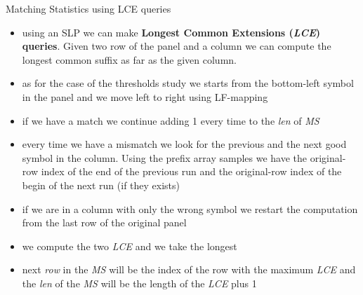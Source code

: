 \documentclass{beamer}
\begin{document}
\begin{frame}{Matching Statistics using LCE queries}
  \begin{block}{}
    \small
    \begin{itemize}
      \item using an SLP we can make \textbf{Longest Common Extensions
        (\textit{LCE}) queries}. Given two row of the panel and a column we can
      compute the longest common suffix as far as the given column.
      \item as for the case of the thresholds study we starts from the
      bottom-left symbol in the panel and we move left to right using LF-mapping
      
      \item if we have a match we continue adding 1 every time to the
      \textit{len} of \textit{MS}
      \item every time we have a mismatch we look for the previous and the next
      good symbol in the column. Using the prefix array samples we have the
      original-row index of the end of the previous run and the original-row
      index of the begin of the next run (if they exists)
      \item if we are in a column with only the wrong symbol we restart the
      computation from the last row of the original panel
      \item we compute the two \textit{LCE} and we take the longest
      \item next \textit{row} in the \textit{MS} will be the index of the row
      with the maximum \textit{LCE} and the \textit{len} of the \textit{MS} will
      be the length of the \textit{LCE} plus 1 
    \end{itemize}
  \end{block}
\end{frame}
\end{document}
